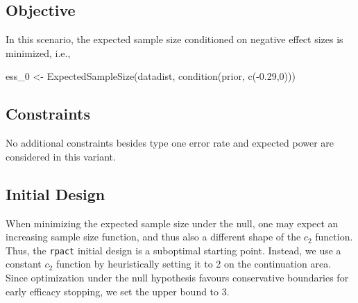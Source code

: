 \documentclass[
]{book}
\newenvironment{Shaded}{\begin{snugshade}}{\end{snugshade}}
\newcommand{\DecValTok}[1]{\textcolor[rgb]{0.00,0.00,0.81}{#1}}
\newcommand{\FloatTok}[1]{\textcolor[rgb]{0.00,0.00,0.81}{#1}}
\newcommand{\FunctionTok}[1]{\textcolor[rgb]{0.00,0.00,0.00}{#1}}
\newcommand{\NormalTok}[1]{#1}
\newcommand{\OtherTok}[1]{\textcolor[rgb]{0.56,0.35,0.01}{#1}}
\newcommand{\SpecialCharTok}[1]{\textcolor[rgb]{0.00,0.00,0.00}{#1}}
\begin{document}
\hypertarget{objective-18}{%
\subsection{Objective}\label{objective-18}}

In this scenario, the expected sample size conditioned on negative effect sizes is minimized, i.e.,

\begin{Shaded}
\begin{Highlighting}[]
\NormalTok{ess\_0 }\OtherTok{\textless{}{-}} \FunctionTok{ExpectedSampleSize}\NormalTok{(datadist, }\FunctionTok{condition}\NormalTok{(prior, }\FunctionTok{c}\NormalTok{(}\SpecialCharTok{{-}}\FloatTok{0.29}\NormalTok{,}\DecValTok{0}\NormalTok{)))}
\end{Highlighting}
\end{Shaded}

\hypertarget{constraints-18}{%
\subsection{Constraints}\label{constraints-18}}

No additional constraints besides type one error rate and expected power are considered in this variant.

\hypertarget{initial-design-14}{%
\subsection{Initial Design}\label{initial-design-14}}

When minimizing the expected sample size under the null, one may expect an increasing sample size function, and thus also a different shape of the \(c_2\) function. Thus, the \texttt{rpact} initial design is a suboptimal starting point. Instead, we use a constant \(c_2\) function by heuristically setting it to 2 on the continuation area. Since optimization under the null hypothesis favours conservative boundaries for early efficacy stopping, we set the upper bound to 3.
\end{document}
